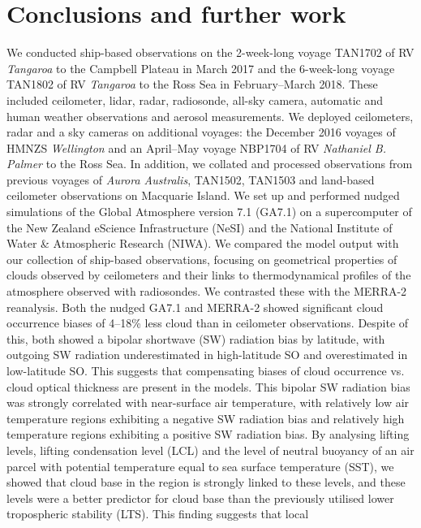 \chapter{Conclusions and further work}

We conducted ship-based observations on the 2-week-long voyage TAN1702 of
RV \textit{Tangaroa} to the Campbell Plateau
in March 2017 and the 6-week-long voyage TAN1802 of RV \textit{Tangaroa} to the Ross Sea
in February--March 2018. These included ceilometer, lidar, radar, radiosonde,
all-sky camera, automatic and human weather observations and aerosol measurements.
We deployed ceilometers, radar and a sky cameras on additional voyages:
the December 2016 voyages of HMNZS \textit{Wellington} and an 
April--May voyage NBP1704 of RV \textit{Nathaniel B. Palmer} to the Ross Sea.
In addition, we collated and processed observations from previous voyages
of \textit{Aurora Australis}, TAN1502, TAN1503 and land-based ceilometer
observations on Macquarie Island.
We set up and performed nudged simulations
of the Global Atmosphere version 7.1 (GA7.1) on a supercomputer of the New Zealand eScience Infrastructure (NeSI) and the National Institute of Water \& Atmospheric Research (NIWA).
We compared the model output with our collection of ship-based observations,
focusing on geometrical properties of clouds observed by ceilometers and their
links to thermodynamical profiles of the atmosphere observed with radiosondes.
We contrasted these with the MERRA-2 reanalysis. Both the nudged GA7.1 and MERRA-2
showed significant cloud occurrence biases of 4--18\% less cloud than in
ceilometer observations. Despite of this, both showed a bipolar shortwave (SW)
radiation
bias by latitude, with outgoing SW radiation underestimated in high-latitude
SO and overestimated in low-latitude SO. This suggests that compensating biases
of cloud occurrence vs. cloud optical thickness are present in the models.
This bipolar SW radiation bias was strongly correlated with near-surface air temperature,
with relatively low air temperature regions exhibiting a negative SW radiation bias and
relatively high temperature regions exhibiting a positive SW radiation bias. By analysing
lifting levels, lifting condensation level (LCL) and the level of neutral buoyancy
of an air parcel with potential temperature equal to sea surface temperature (SST),
we showed that cloud base in the region is strongly linked to these levels,
and these levels were a better predictor for cloud base than the previously
utilised lower tropospheric stability (LTS). This finding suggests that local
